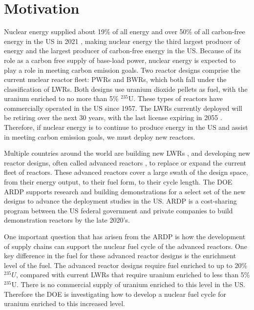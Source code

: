 \section{Motivation}
Nuclear energy supplied about 19\% of all energy and over 50\%  
of all carbon-free energy in the US in 2021 
\cite{energy_information_administration_electricity_2022}, making nuclear 
energy the third largest producer of energy and the largest 
producer of carbon-free energy in the US. Because of its role 
as a carbon free supply of base-load power, nuclear energy is expected 
to play a role in meeting carbon emission goals. Two reactor designs 
comprise the current nuclear reactor fleet: \glspl{PWR} and \glspl{BWR}, 
which both fall under the classification of \glspl{LWR}.
Both designs use uranium dioxide pellets as fuel, with the uranium 
enriched to no more than 5\% $^{235}$U. These types of reactors 
have commercially operated in the US since 1957. The \glspl{LWR} 
currently deployed will be retiring over the next 30 years, with the 
last license expiring in 2055 \cite{nei_us_2021}. Therefore, if 
nuclear energy is to continue to produce energy in the US 
and assist in meeting carbon emission goals, we must deploy new reactors. 

Multiple countries around the world are building new \glspl{LWR}
\cite{world_nuclear_association_plans_2022}, and developing
new reactor designs, often called advanced reactors 
\cite{hussain_advances_2018}, to 
replace or expand the current fleet of reactors. These advanced reactors 
cover a large swath of the design space, from their energy output, to their 
fuel form, to their cycle length. The 
\gls{DOE} \gls{ARDP} \cite{noauthor_advanced_nodate}
supports research and building demonstrations for a select set of 
the new designs to advance the deployment studies in the US. \gls{ARDP} is a cost-sharing 
program between the US federal government and private companies to build 
demonstration reactors by the late 2020's. 

One important question that has arisen from the \gls{ARDP} is how the 
development of supply chains can support the nuclear fuel cycle of the 
advanced reactors. 
One key difference in the fuel for these advanced 
reactor designs is the enrichment 
level of the fuel. The advanced reactor designs require fuel enriched to 
up to 20\% $^{235}U$, compared with current \glspl{LWR} that require 
uranium enriched to less than 5\% $^{235}$U. There is no 
commercial supply of 
uranium enriched to this level in the US. Therefore the \gls{DOE} 
is investigating how to develop a nuclear fuel cycle for uranium enriched to this 
increased level. 

